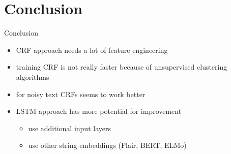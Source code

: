 \documentclass[12pt, tikz]{beamer}
\begin{document}
\section{Conclusion}

\begin{frame}[fragile]{Conclusion}
	\begin{itemize}
		\item<1-> CRF approach needs a lot of feature engineering
		\item<2-> training CRF is not really faster because of unsupervised clustering algorithms
		\item<3-> for noisy text CRFs seems to work better
		\item<4-> LSTM approach has more potential for improvement
		\begin{itemize}
			\item use additional input layers
			\item use other string embeddings (Flair, BERT, ELMo)
		\end{itemize}
	\end{itemize}
\end{frame}


\end{document}
